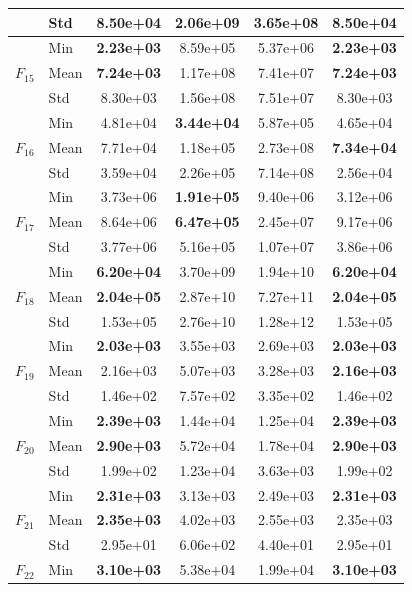 \begin{center}
\begin{longtable}{clcccc}
 & Std & 8.50e+04 & 2.06e+09 & 3.65e+08 & 8.50e+04 \\
\midrule
\multirow{3}{*}{$F_{15}$} & Min & \textbf{2.23e+03} & 8.59e+05 & 5.37e+06 & \textbf{2.23e+03} \\
 & Mean & \textbf{7.24e+03} & 1.17e+08 & 7.41e+07 & \textbf{7.24e+03} \\
 & Std & 8.30e+03 & 1.56e+08 & 7.51e+07 & 8.30e+03 \\
\midrule
\multirow{3}{*}{$F_{16}$} & Min & 4.81e+04 & \textbf{3.44e+04} & 5.87e+05 & 4.65e+04 \\
 & Mean & 7.71e+04 & 1.18e+05 & 2.73e+08 & \textbf{7.34e+04} \\
 & Std & 3.59e+04 & 2.26e+05 & 7.14e+08 & 2.56e+04 \\
\midrule
\multirow{3}{*}{$F_{17}$} & Min & 3.73e+06 & \textbf{1.91e+05} & 9.40e+06 & 3.12e+06 \\
 & Mean & 8.64e+06 & \textbf{6.47e+05} & 2.45e+07 & 9.17e+06 \\
 & Std & 3.77e+06 & 5.16e+05 & 1.07e+07 & 3.86e+06 \\
\midrule
\multirow{3}{*}{$F_{18}$} & Min & \textbf{6.20e+04} & 3.70e+09 & 1.94e+10 & \textbf{6.20e+04} \\
 & Mean & \textbf{2.04e+05} & 2.87e+10 & 7.27e+11 & \textbf{2.04e+05} \\
 & Std & 1.53e+05 & 2.76e+10 & 1.28e+12 & 1.53e+05 \\
\midrule
\multirow{3}{*}{$F_{19}$} & Min & \textbf{2.03e+03} & 3.55e+03 & 2.69e+03 & \textbf{2.03e+03} \\
 & Mean & 2.16e+03 & 5.07e+03 & 3.28e+03 & \textbf{2.16e+03} \\
 & Std & 1.46e+02 & 7.57e+02 & 3.35e+02 & 1.46e+02 \\
\midrule
\multirow{3}{*}{$F_{20}$} & Min & \textbf{2.39e+03} & 1.44e+04 & 1.25e+04 & \textbf{2.39e+03} \\
 & Mean & \textbf{2.90e+03} & 5.72e+04 & 1.78e+04 & \textbf{2.90e+03} \\
 & Std & 1.99e+02 & 1.23e+04 & 3.63e+03 & 1.99e+02 \\
\midrule
\multirow{3}{*}{$F_{21}$} & Min & \textbf{2.31e+03} & 3.13e+03 & 2.49e+03 & \textbf{2.31e+03} \\
 & Mean & \textbf{2.35e+03} & 4.02e+03 & 2.55e+03 & 2.35e+03 \\
 & Std & 2.95e+01 & 6.06e+02 & 4.40e+01 & 2.95e+01 \\
\midrule
\multirow{3}{*}{$F_{22}$} & Min & \textbf{3.10e+03} & 5.38e+04 & 1.99e+04 & \textbf{3.10e+03} \\

\end{longtable}
\end{center}
